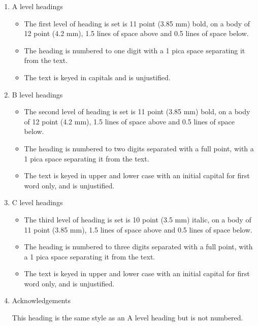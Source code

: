 \documentclass{ecai}
\begin{document}
\begin{enumerate}
\item{A level headings}

\begin{itemize}
\item The first level of heading is set is 11 point (3.85 mm) bold, on
  a body of 12 point (4.2 mm), 1.5 lines of space above and 0.5 lines
  of space below.

\item The heading is numbered to one digit with a 1 pica space
  separating it from the text.

\item The text is keyed in capitals and is unjustified.
\end{itemize}

\item{B level headings}
\begin{itemize}
\item The second level of heading is set is 11 point (3.85 mm) bold,
  on a body of 12 point (4.2 mm), 1.5 lines of space above and 0.5
  lines of space below.

\item The heading is numbered to two digits separated with a full
  point, with a 1 pica space separating it from the text.

\item The text is keyed in upper and lower case with an initial
  capital for first word only, and is unjustified.
\end{itemize}

\item{C level headings}
\begin{itemize}
\item The third level of heading is set is 10 point (3.5 mm) italic,
  on a body of 11 point (3.85 mm), 1.5 lines of space above and 0.5
  lines of space below.

\item The heading is numbered to three digits separated with a full
  point, with a 1 pica space separating it from the text.

\item The text is keyed in upper and lower case with an initial
  capital for first word only, and is unjustified.
\end{itemize}

\item{Acknowledgements}

  This heading is the same style as an A level heading but is not
  numbered.
\end{enumerate}
\end{document}
